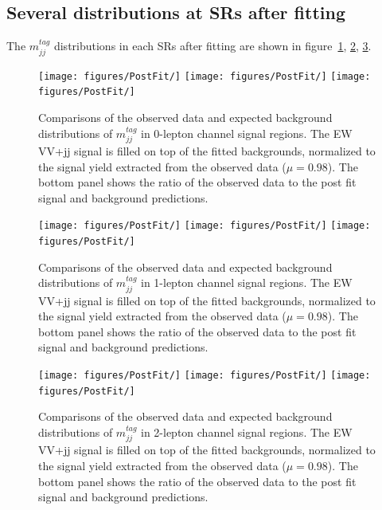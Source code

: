 \subsection{Several distributions at SRs after fitting}
The $m^{tag}_{jj}$ distributions in each SRs after fitting are shown in figure~\ref{fig:postSR0lepmtagjj}, \ref{fig:postSR1lepmtagjj}, \ref{fig:postSR2lepmtagjj}. 
\begin{figure}[]
    \centering
    \texttt{[image: figures/PostFit/]}
    \texttt{[image: figures/PostFit/]}
    \texttt{[image: figures/PostFit/]}
      \caption{Comparisons of the observed data and expected background distributions of $m^{tag}_{jj}$ in 0-lepton channel signal regions. The EW VV+jj signal is filled on top of the fitted backgrounds, normalized to the signal yield extracted from the observed data ($\mu = 0.98$). The bottom panel shows the ratio of the observed data to the post fit signal and background predictions.}
      \label{fig:postSR0lepmtagjj}
\end{figure}
\begin{figure}[]
    \centering
    \texttt{[image: figures/PostFit/]}
    \texttt{[image: figures/PostFit/]}
    \texttt{[image: figures/PostFit/]}
      \caption{Comparisons of the observed data and expected background distributions of $m^{tag}_{jj}$ in 1-lepton channel signal regions. The EW VV+jj signal is filled on top of the fitted backgrounds, normalized to the signal yield extracted from the observed data ($\mu = 0.98$). The bottom panel shows the ratio of the observed data to the post fit signal and background predictions.}
      \label{fig:postSR1lepmtagjj}
\end{figure}
\begin{figure}[]
    \centering
    \texttt{[image: figures/PostFit/]}
    \texttt{[image: figures/PostFit/]}
    \texttt{[image: figures/PostFit/]}
    \caption{Comparisons of the observed data and expected background distributions of $m^{tag}_{jj}$ in 2-lepton channel signal regions. The EW VV+jj signal is filled on top of the fitted backgrounds, normalized to the signal yield extracted from the observed data ($\mu = 0.98$). The bottom panel shows the ratio of the observed data to the post fit signal and background predictions.}
    \label{fig:postSR2lepmtagjj}
\end{figure}

